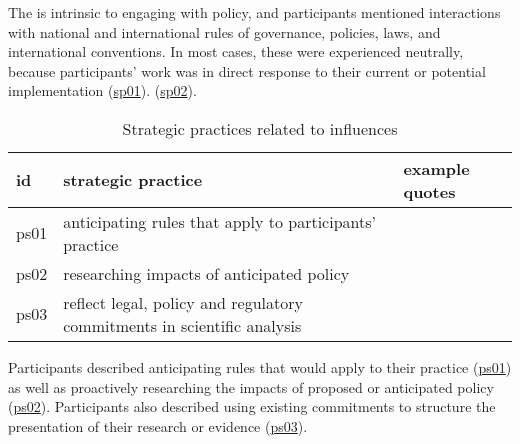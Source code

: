 The \skipoli{} is intrinsic to engaging with policy, and participants mentioned interactions with national and international rules of governance, policies, laws, and international conventions. In most cases, these were experienced neutrally, because participants' work was in direct response to their current or potential implementation (\hyperref[tab:resskipoli]{sp01}).  (\hyperref[tab:resskipoli]{sp02}).

\begin{table}[!ht]
\footnotesize
\caption{Strategic practices related to \skipoli{} influences}\label{tab:resskipolistrat}
\begin{tabular}{L{.06\linewidth}L{.3\linewidth}L{.64\linewidth}} \hline
\textbf{id} & \textbf{strategic practice} & \textbf{example quotes} \\ \hline \hline
ps01 & anticipating rules that apply to participants' practice &  \\[5mm] 
ps02 & researching impacts of anticipated policy &  \\[5mm] 
ps03 & reflect legal, policy and regulatory commitments in scientific analysis &  \\[5mm] 
\hline
 \end{tabular}
\end{table}

Participants described anticipating rules that would apply to their practice (\hyperref[tab:resskipolistrat]{ps01}) as well as proactively researching the impacts of proposed or anticipated policy (\hyperref[tab:resskipolistrat]{ps02}). Participants also described using existing commitments to structure the presentation of their research or evidence (\hyperref[tab:resskipolistrat]{ps03}).

\subsection{\titinst}\label{sec:resskiinst}

